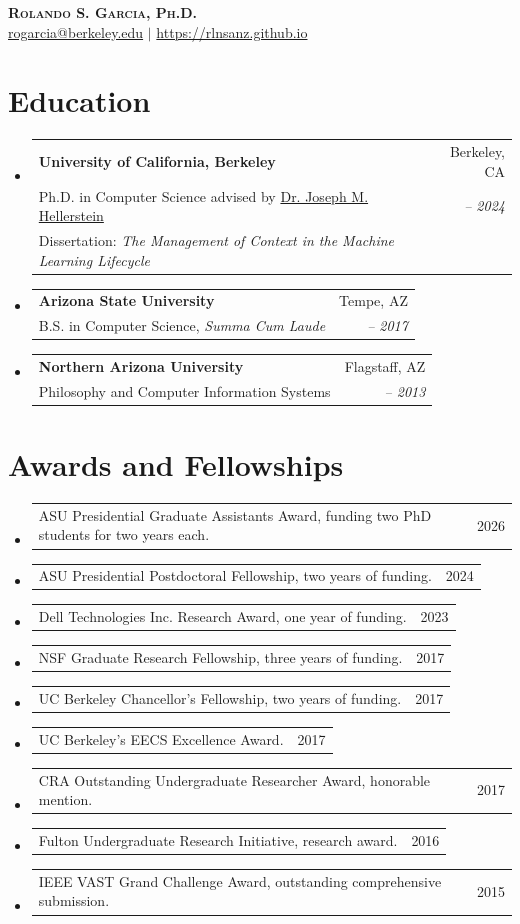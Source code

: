 \documentclass[letterpaper,10pt]{article}
\makeatletter
\newcommand{\dissertationHeading}[5]{
  \item
    \begin{tabular*}{\linewidth}[t]{l@{\extracolsep{\fill}}r}
      \textbf{#1} & #2 \\
      \small#3 & \textit{\small #4} \\
      Dissertation: \textit{#5}  & \\
    \end{tabular*}\vspace{-4pt}
}
\newcommand{\resumeSubheading}[4]{
  \item
    \begin{tabular*}{\linewidth}[t]{l@{\extracolsep{\fill}}r}
      \textbf{#1} & #2 \\
      \small#3 & \textit{\small #4} \\
    \end{tabular*}\vspace{-4pt}
}
\newcommand{\resumeSubSubheading}[2]{
    \item
  \begin{tabular*}{\linewidth}{l@{\extracolsep{\fill}}r}
      #1 & #2 \\
    \end{tabular*}\vspace{-4pt}
}
\newcommand{\resumeSubHeadingListStart}{\begin{itemize}[leftmargin=0.15in,label={},topsep=3pt,partopsep=0pt,itemsep=6pt,parsep=0pt]}
\newcommand{\resumeSubHeadingListEnd}{\end{itemize}}
\makeatother
\begin{document}
\begingroup
\fontsize{10.95}{13.2}\selectfont
\renewcommand{\small}{\fontsize{10}{12}\selectfont}

\begin{center}
  \textbf{\LARGE \textsc{Rolando S. Garcia, Ph.D.}} \\ \vspace{1pt}
  \href{mailto:rogarcia@berkeley.edu}{rogarcia@berkeley.edu} $|$
  \href{https://rlnsanz.github.io}{https://rlnsanz.github.io}\\
\end{center}


\section{Education}
\resumeSubHeadingListStart
\dissertationHeading
{University of California, Berkeley}{Berkeley, CA}
{Ph.D. in Computer Science advised by \href{https://dsf.berkeley.edu/jmh/}{Dr. Joseph M. Hellerstein}}{2017 -- 2024}{The Management of Context in the Machine Learning Lifecycle}
\resumeSubheading
{Arizona State University}{Tempe, AZ}
{B.S. in Computer Science, \textit{Summa Cum Laude}}{2014 -- 2017}
\resumeSubheading
{Northern Arizona University}{Flagstaff, AZ}
{Philosophy and Computer Information Systems}{2010 -- 2013}
\resumeSubHeadingListEnd

\section{Awards and Fellowships}
\resumeSubHeadingListStart
\resumeSubSubheading
{ASU Presidential Graduate Assistants Award, funding two PhD students for two years each.}{2026}
\resumeSubSubheading
{ASU Presidential Postdoctoral Fellowship, two years of funding.}{2024}
\resumeSubSubheading
{Dell Technologies Inc. Research Award, one year of funding.}{2023}
\resumeSubSubheading
{NSF Graduate Research Fellowship, three years of funding.}{2017}
\resumeSubSubheading
{UC Berkeley Chancellor's Fellowship, two years of funding.}{2017}
\resumeSubSubheading
{UC Berkeley's EECS Excellence Award.}{2017}
\resumeSubSubheading
{CRA Outstanding Undergraduate Researcher Award, honorable mention.}{2017}
\resumeSubSubheading
{Fulton Undergraduate Research Initiative, research award.}{2016}
\resumeSubSubheading
{IEEE VAST Grand Challenge Award, outstanding comprehensive submission.}{2015}
\resumeSubHeadingListEnd

\end{document}
